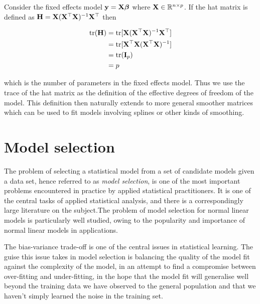 
Consider the fixed effects model ${\bf y} = {\bf X} {\boldsymbol \beta}$ where ${\bf X} \in {\mathbb{R}}^{n \times p}$. If the hat matrix is
defined as ${\bf H} = {\bf X} ({\bf X}^\top{\bf X})^{-1} {\bf X}^\top$ then

\begin{align*}
	\text{tr}({\bf H}) & = \text{tr}[{\bf X}({\bf X}^\top{\bf X})^{-1}{\bf X}^\top]  \\
	         & = \text{tr}[{\bf X}^\top{\bf X} ({\bf X}^\top{\bf X})^{-1}] \\
	         & = \text{tr}({\bf I}_p)                          \\
	         & = p                                   
\end{align*}

which is the number of parameters in the fixed effects model. Thus we use the trace of the hat matrix as
the definition of the effective degrees of freedom of the model. This definition then naturally extends to
more general smoother matrices which can be used to fit models involving splines or other kinds of smoothing.


\section{Model selection}

The problem of selecting a statistical model from a set of candidate models given a data set, hence referred
to as \emph{model selection}, is one of the most important problems encountered in practice by applied
statistical practitioners. It is one of the central tasks of applied statistical analysis, and there is a
correspondingly large literature on the subject.The problem of model selection for normal linear models is
particularly well studied, owing to the popularity and importance of normal linear models in applications.

The bias-variance trade-off is one of the central issues in statistical learning. The guise this issue takes
in model selection is balancing the quality of the model fit against the complexity of the model, in an
attempt to find a compromise between over-fitting and under-fitting, in the hope that the model fit will
generalise well beyond the training data we have observed to the general population and that we haven't simply
learned the noise in the training set.

